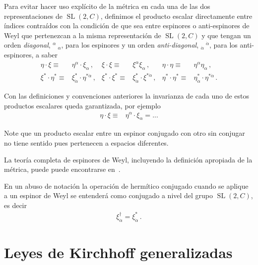 \begin{frame}
Para evitar hacer uso explícito de la métrica en cada una de las dos representaciones de $\operatorname{SL}(2,C)$, definimos el producto escalar directamente entre índices contraídos con la condición de que sea entre espinores o anti-espinores de Weyl que pertenezcan a la misma representación de $\operatorname{SL}(2,C)$ y que tengan un orden \emph{diagonal}, ${}^{\alpha}\ {}_{\alpha}$, para los espinores y un orden \emph{anti-diagonal}, ${}_{\dot{\alpha}}\ {}^{\dot{\alpha}}$, para los anti-espinores, a saber
\begin{align}
  \eta\cdot\xi\equiv& \eta^{\alpha} \cdot \xi_{\alpha} \,,&
  \xi\cdot \xi\equiv&\xi^{\alpha}\xi_{\alpha}\,, &
  \eta\cdot\eta\equiv &\eta^{\alpha}\eta_{\alpha}\,,\nonumber\\
  \xi^{*}\cdot \eta^{*}\equiv & \xi^{*}_{\dot{\alpha}}\cdot \eta^{*\dot{\alpha}}\,,&
  \xi^{*}\cdot \xi^{*}\equiv & \xi^{*}_{\dot{\alpha}}\cdot \xi^{*\dot{\alpha}}\,,&
  \eta^{*}\cdot \eta^{*}\equiv & \eta^{*}_{\dot{\alpha}}\cdot \eta^{*\dot{\alpha}}\,.
\end{align}

Con las definiciones y convenciones anteriores la invarianza de cada uno de estos productos escalares queda garantizada, por ejemplo
\begin{align*}
   \eta\cdot\xi\equiv& \eta^{\alpha} \cdot \xi_{\alpha} =...
\end{align*}

Note que un producto escalar entre un espinor conjugado con otro sin conjugar no tiene sentido pues pertenecen a espacios diferentes.
\end{frame}



La teoría completa de espinores de Weyl, incluyendo la definición apropiada de la métrica, puede puede encontrarse en~\cite{Dreiner:2008tw}.

En un abuso de notación la operación de hermítico conjugado cuando se aplique a un espinor de Weyl se entenderá como conjugado a nivel del grupo $\operatorname{SL}(2,C)$, es decir
\begin{align}
  \xi_{\dot{\alpha}}^{\dagger}=\xi_{\dot{\alpha}}^{*}\,.
\end{align}


\section{Leyes de Kirchhoff generalizadas}


